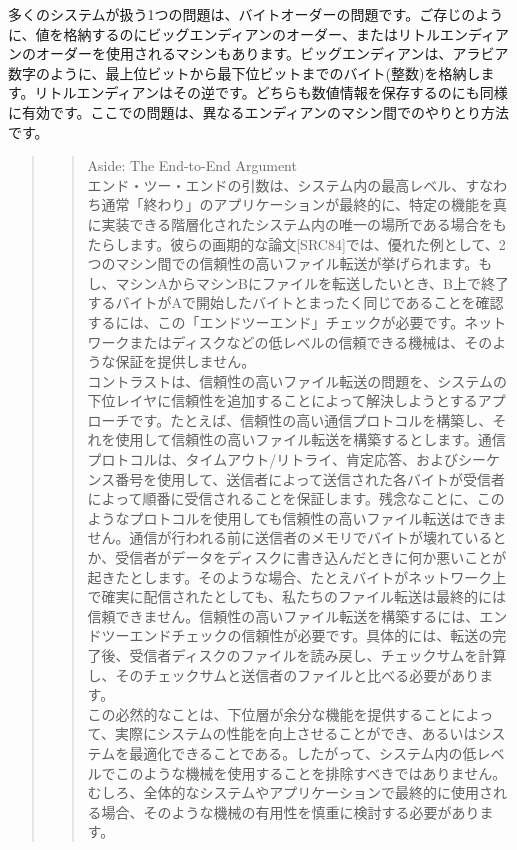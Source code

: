 多くのシステムが扱う1つの問題は、バイトオーダーの問題です。ご存じのように、値を格納するのにビッグエンディアンのオーダー、またはリトルエンディアンのオーダーを使用されるマシンもあります。ビッグエンディアンは、アラビア数字のように、最上位ビットから最下位ビットまでのバイト(整数)を格納します。リトルエンディアンはその逆です。どちらも数値情報を保存するのにも同様に有効です。ここでの問題は、異なるエンディアンのマシン間でのやりとり方法です。

\begin{quote}
\begin{quote}
Aside: The End-to-End Argument\\
エンド・ツー・エンドの引数は、システム内の最高レベル、すなわち通常「終わり」のアプリケーションが最終的に、特定の機能を真に実装できる階層化されたシステム内の唯一の場所である場合をもたらします。彼らの画期的な論文{[}SRC84{]}では、優れた例として、2つのマシン間での信頼性の高いファイル転送が挙げられます。もし、マシンAからマシンBにファイルを転送したいとき、B上で終了するバイトがAで開始したバイトとまったく同じであることを確認するには、この「エンドツーエンド」チェックが必要です。ネットワークまたはディスクなどの低レベルの信頼できる機械は、そのような保証を提供しません。\\
コントラストは、信頼性の高いファイル転送の問題を、システムの下位レイヤに信頼性を追加することによって解決しようとするアプローチです。たとえば、信頼性の高い通信プロトコルを構築し、それを使用して信頼性の高いファイル転送を構築するとします。通信プロトコルは、タイムアウト/リトライ、肯定応答、およびシーケンス番号を使用して、送信者によって送信された各バイトが受信者によって順番に受信されることを保証します。残念なことに、このようなプロトコルを使用しても信頼性の高いファイル転送はできません。通信が行われる前に送信者のメモリでバイトが壊れているとか、受信者がデータをディスクに書き込んだときに何か悪いことが起きたとします。そのような場合、たとえバイトがネットワーク上で確実に配信されたとしても、私たちのファイル転送は最終的には信頼できません。信頼性の高いファイル転送を構築するには、エンドツーエンドチェックの信頼性が必要です。具体的には、転送の完了後、受信者ディスクのファイルを読み戻し、チェックサムを計算し、そのチェックサムと送信者のファイルと比べる必要があります。\\
この必然的なことは、下位層が余分な機能を提供することによって、実際にシステムの性能を向上させることができ、あるいはシステムを最適化できることである。したがって、システム内の低レベルでこのような機械を使用することを排除すべきではありません。むしろ、全体的なシステムやアプリケーションで最終的に使用される場合、そのような機械の有用性を慎重に検討する必要があります。
\end{quote}
\end{quote}


